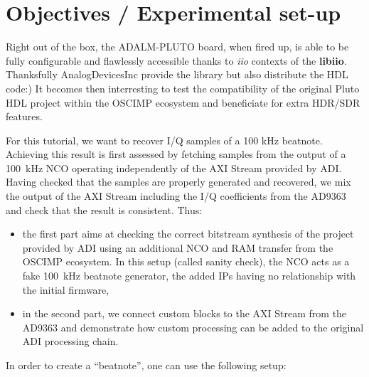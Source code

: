 \documentclass[12pt,oneside]{article}
\begin{document}
\section{Objectives / Experimental set-up}

Right out of the box, the ADALM-PLUTO board, when fired up, is able to be fully
configurable and flawlessly accessible thanks to \emph{iio} contexts of the {\bf{libiio}}.
Thanksfully AnalogDevicesInc provide the library but also distribute the HDL
code:)
It becomes then interresting to test the compatibility of the original Pluto HDL
project within the OSCIMP ecosystem and beneficiate for extra HDR/SDR features.

For this tutorial, we want to recover I/Q samples of a 100 kHz beatnote. Achieving this
result is first assessed by fetching samples from the output of a 100~kHz NCO operating
independently of the AXI Stream provided by ADI. Having checked that the samples are
properly generated and recovered, we mix the output of the AXI Stream including the
I/Q coefficients from the AD9363 and check that the result is consistent. Thus:

\begin{itemize}
\item the first part aims at checking the correct bitstream synthesis of the project
provided by ADI using an additional NCO and RAM transfer from the OSCIMP
ecosystem. In this setup (called sanity check), the NCO acts as a fake 100~kHz
beatnote generator, the added IPs having no relationship with the initial
firmware,
\item in the second part, we connect custom blocks to the AXI Stream from the
AD9363 and demonstrate how custom processing can be added to the original ADI processing chain.
\end{itemize}


In order to create a ``beatnote'', one can use the following setup:
\end{document}
